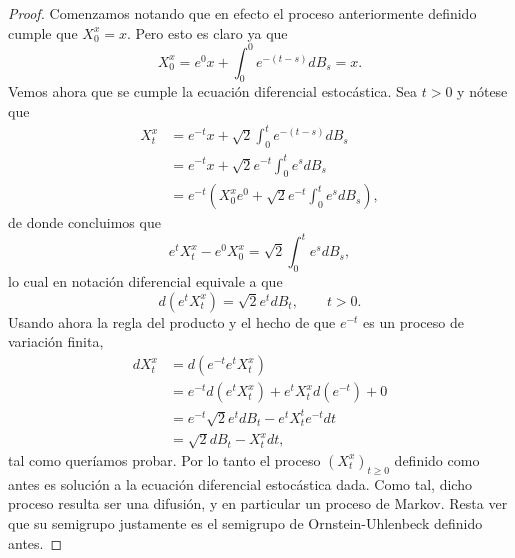 \documentclass[letterpaper,twoside,12pt]{book}
\newcommand{\1}{\mathds{1}}
\theoremstyle{definition}
\theoremstyle{definition}
\theoremstyle{remark}
\theoremstyle{definition}
\theoremstyle{definition}
\theoremstyle{definition}
\theoremstyle{definition}
\theoremstyle{definition}
\begin{document}
   \begin{proof} 
     Comenzamos notando que en efecto el proceso anteriormente definido cumple que $X_0^x=x$. Pero esto es claro ya que 
     \[
     X_0^x=e^{0}x+\int_{0}^{0}e^{-(t-s)}dB_s=x.
     \] 
     Vemos ahora que se cumple la ecuación diferencial estocástica. Sea $t>0$ y nótese que 
     \begin{align*}
       X_t^x&=e^{-t}x+\sqrt{2}\int_0^te^{-(t-s)}dB_s\\
       &=e^{-t}x+\sqrt{2}e^{-t}\int_0^{t}e^{s}dB_s\\
       &=e^{-t}\left(X_0^{x}e^{0}+\sqrt{2}e^{-t}\int_0^te^{s}dB_s \right),
     \end{align*}
     de donde concluimos que 
     \[
     e^{t}X_t^x-e^{0}X_0^x=\sqrt{2}\int_{0}^{t}e^{s}dB_s,
     \]
     lo cual en notación diferencial equivale a que 
     \[
     d \left(e^tX_t^x\right)=\sqrt{2}e^{t}dB_t,  \qquad t>0.
     \]
     Usando ahora la regla del producto y el hecho de que $e^{-t}$ es un proceso de variación finita,  
     \begin{align*}
       dX_t^{x}&=d(e^{-t}e^{t}X_t^{x})\\
       &=e^{-t}d(e^{t}X_t^{x})+e^{t}X_t^{x}d(e^{-t})+0\\
       &=e^{-t}\sqrt{2}e^{t}dB_t-e^{t}X_t^{t}e^{-t}dt\\
       &=\sqrt{2}dB_t-X_t^xdt,
     \end{align*}
     tal como queríamos probar. Por lo tanto el proceso $(X_t^x)_{t\geq0}$ definido como antes es solución a la ecuación diferencial estocástica dada. Como tal, dicho proceso resulta ser una difusión, y en particular un proceso de Markov. Resta ver que su semigrupo justamente es el semigrupo de Ornstein-Uhlenbeck definido antes.


\end{proof}
\end{document}
